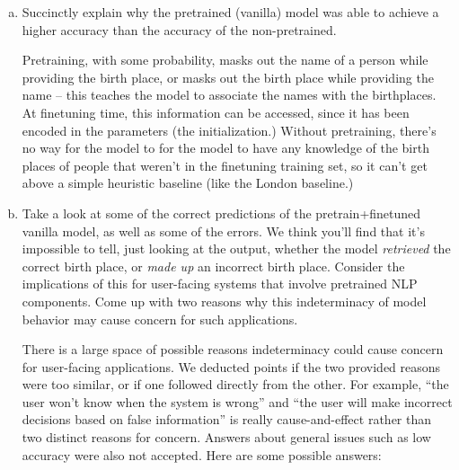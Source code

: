 \begin{enumerate}[(a)]

\item
Succinctly explain why the pretrained (vanilla) model was able to achieve a higher accuracy than the accuracy of the non-pretrained.

\begin{answer}
Pretraining, with some probability, masks out the name of a person while providing the birth place, or masks out the birth place while providing the name -- this teaches the model to associate the names with the birthplaces.
At finetuning time, this information can be accessed, since it has been encoded in the parameters (the initialization.)
Without pretraining, there's no way for the model to for the model to have any knowledge of the birth places of people that weren't in the finetuning training set, so it can't get above a simple heuristic baseline (like the London baseline.)
\end{answer}

\item
Take a look at some of the correct predictions of the pretrain+finetuned vanilla model, as well as some of the errors.
We think you'll find that it's impossible to tell, just looking at the output, whether the model \textit{retrieved} the correct birth place, or \textit{made up} an incorrect birth place.
Consider the implications of this for user-facing systems that involve pretrained NLP components.
Come up with two reasons why this indeterminacy of model behavior may cause concern for such applications.

\begin{answer}
There is a large space of possible reasons indeterminacy could cause concern for user-facing applications. We deducted points if the two provided reasons were too similar, or if one followed directly from the other. For example, ``the user won't know when the system is wrong'' and ``the user will make incorrect decisions based on false information'' is really cause-and-effect rather than two distinct reasons for concern. Answers about general issues such as low accuracy were also not accepted.
Here are some possible answers:


\end{answer}
\end{enumerate}
